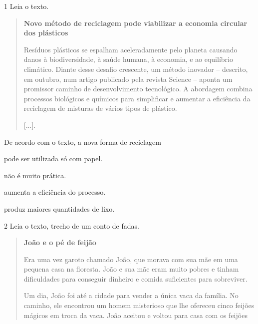 \pagebreak
{}

\num{1} Leia o texto.

\begin{quote}
\textbf{Novo método de reciclagem pode viabilizar a economia circular dos plásticos}

Resíduos plásticos se espalham aceleradamente pelo planeta causando
danos à biodiversidade, à saúde humana, à economia, e ao equilíbrio
climático. Diante desse desafio crescente, um método inovador –
descrito, em outubro, num artigo publicado pela revista Science –
aponta um promissor caminho de desenvolvimento tecnológico. A abordagem
combina processos biológicos e químicos para simplificar e aumentar a
eficiência da reciclagem de misturas de vários tipos de plástico.

{[}...{]}.

\end{quote}

De acordo com o texto, a nova forma de reciclagem

\begin{minipage}{.5\textwidth}
\begin{escolha}
\item pode ser utilizada só com papel.

\item não é muito prática.

\item aumenta a eficiência do processo.

\item produz maiores quantidades de lixo.
\end{escolha}
\end{minipage}

\num{2} Leia o texto, trecho de um conto de fadas.

\begin{quote}
\textbf{João e o pé de feijão}

Era uma vez garoto chamado João, que morava com sua mãe em uma pequena
casa na floresta. João e sua mãe eram muito pobres e tinham dificuldades
para conseguir dinheiro e comida suficientes para sobreviver.

Um dia, João foi até a cidade para vender a única vaca da família. No
caminho, ele encontrou um homem misterioso que lhe ofereceu cinco
feijões mágicos em troca da vaca. João aceitou e voltou para casa com os
feijões
\end{quote}


